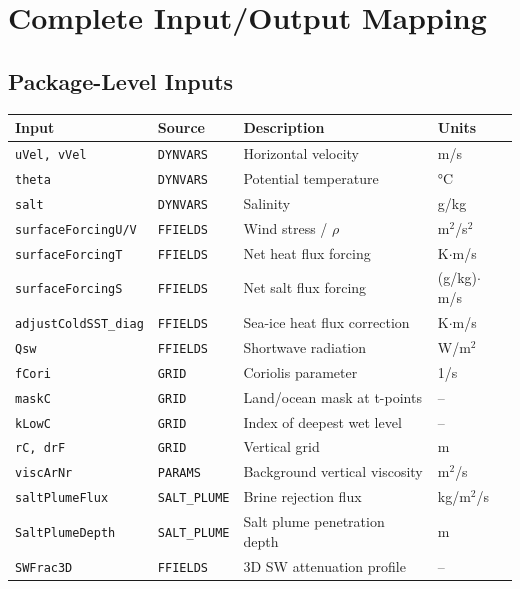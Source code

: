 \documentclass[12pt,letterpaper]{article}
\begin{document}
  
\appendix  
  
\section{Complete Input/Output Mapping}  
\label{app:io_mapping}  
  
\subsection{Package-Level Inputs}  
  
\begin{longtable}{p{3.5cm} p{3cm} p{5cm} l}  
\toprule  
\textbf{Input} & \textbf{Source} & \textbf{Description} & \textbf{Units} \\  
\midrule  
\endhead  
\texttt{uVel, vVel} & \texttt{DYNVARS} & Horizontal velocity & m/s \\  
\texttt{theta} & \texttt{DYNVARS} & Potential temperature & °C \\  
\texttt{salt} & \texttt{DYNVARS} & Salinity & g/kg \\  
\texttt{surfaceForcingU/V} & \texttt{FFIELDS} & Wind stress / $\rho$ & m$^2$/s$^2$ \\  
\texttt{surfaceForcingT} & \texttt{FFIELDS} & Net heat flux forcing & K$\cdot$m/s \\  
\texttt{surfaceForcingS} & \texttt{FFIELDS} & Net salt flux forcing & (g/kg)$\cdot$m/s \\  
\texttt{adjustColdSST\_diag} & \texttt{FFIELDS} & Sea-ice heat flux correction & K$\cdot$m/s \\  
\texttt{Qsw} & \texttt{FFIELDS} & Shortwave radiation & W/m$^2$ \\  
\texttt{fCori} & \texttt{GRID} & Coriolis parameter & 1/s \\  
\texttt{maskC} & \texttt{GRID} & Land/ocean mask at t-points & -- \\  
\texttt{kLowC} & \texttt{GRID} & Index of deepest wet level & -- \\  
\texttt{rC, drF} & \texttt{GRID} & Vertical grid & m \\  
\texttt{viscArNr} & \texttt{PARAMS} & Background vertical viscosity & m$^2$/s \\  
\texttt{saltPlumeFlux} & \texttt{SALT\_PLUME} & Brine rejection flux & kg/m$^2$/s \\  
\texttt{SaltPlumeDepth} & \texttt{SALT\_PLUME} & Salt plume penetration depth & m \\  
\texttt{SWFrac3D} & \texttt{FFIELDS} & 3D SW attenuation profile & -- \\  
\bottomrule  
\end{longtable}  
  
\end{document}
